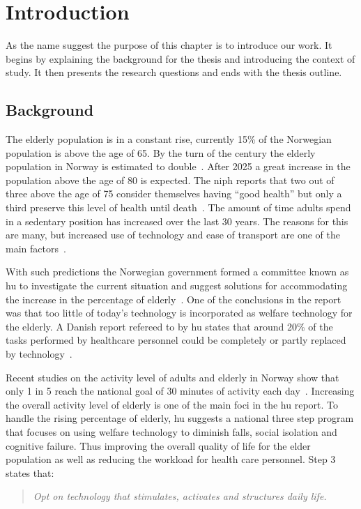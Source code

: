 \chapter{Introduction}
As the name suggest the purpose of this chapter is to introduce our work. It begins by explaining the background for the thesis and introducing the context of study. It then presents the research questions and ends with the thesis outline.

\section{Background}
The elderly population is in a constant rise, currently 15\% of the Norwegian population is above the age of 65. By the turn of the century the elderly population in Norway is estimated to double~\cite{elder}. After 2025 a great increase in the population above the age of 80 is expected. The \gls{niph} reports that two out of three above the age of 75 consider themselves having ``good health'' but only a third preserve this level of health until death~\cite{elder}. The amount of time adults spend in a sedentary position has increased over the last 30 years. The reasons for this are many, but increased use of technology and ease of transport are one of the main factors~\cite{sedentaryBehaviour}.

With such predictions the Norwegian government formed a committee known as \gls{hu} to investigate the current situation and suggest solutions for accommodating the increase in the percentage of elderly~\cite{haagen}. One of the conclusions in the report was that too little of today's technology is incorporated as welfare technology for the elderly. A Danish report refereed to by \gls{hu} states that around 20\% of the tasks performed by healthcare personnel could be completely or partly replaced by technology~\cite{kmd}. 

Recent studies on the activity level of adults and elderly in Norway show that only 1 in 5 reach the national goal of 30 minutes of activity each day~\cite{fysiskAktivitet2009}. Increasing the overall activity level of elderly is one of the main foci in the \gls{hu} report. To handle the rising percentage of elderly, \gls{hu} suggests a national three step program that focuses on using welfare technology to diminish falls, social isolation and cognitive failure. Thus improving the overall quality of life for the elder population as well as reducing the workload for health care personnel. Step 3 states that:
\begin{quote}
\textit{Opt on technology that stimulates, activates and structures daily life.}
\end{quote}

